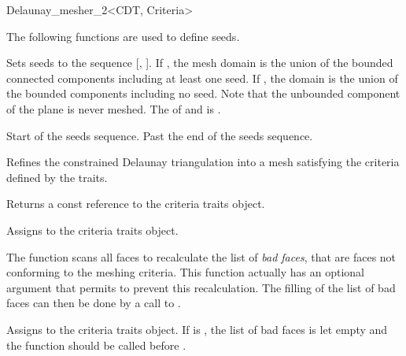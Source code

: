 \begin{ccRefClass}{Delaunay_mesher_2<CDT, Criteria>}

The following functions are used to define seeds.


                       { Sets seeds to the sequence [,
                         ]. If , the mesh domain
                         is the union of the bounded connected
                         components including at least one seed. If
                         , the domain is the union of
                         the bounded components including no seed. Note
                         that the unbounded component of the plane is
                         never meshed.
                         \ccRequire The  of
                          and  is
                         .}

{ Start of the seeds sequence. }
\ccGlue
{}
{ Past the end of the seeds sequence. }


{ Refines the constrained Delaunay triangulation into a mesh
  satisfying the criteria defined by the traits.
}

{ Returns a const reference to the criteria traits object. }

{ Assigns  to the criteria traits object. }

\begin{ccAdvanced}
  The function  scans all faces to recalculate the list of
  \emph{bad faces}, that are faces not conforming to the meshing criteria.
  This function actually has an optional argument that permits to prevent
  this recalculation. The filling of the list of bad faces can then be done
  by a call to .
  
  { Assigns  to the criteria traits object. If
     is , the list of bad faces is
    let empty and the function  should be called before
    .}


\end{ccAdvanced}
\end{ccRefClass}
